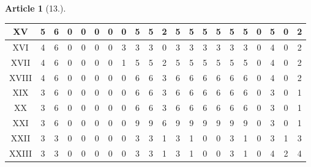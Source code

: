 \documentclass[11pt,a4paper]{article}
\theoremstyle{definition}
\newtheorem{art}{Article}
\begin{document}
\begin{art}[13.]
\begin{center}
\begin{tabular}{|c|c|c|c|c|c|c|c|c|c|c|c|c|c|c|c|c|c|c|c|c|}
\hline
XV & 5 & 6 & 0 & 0 & 0 & 0 & 0 & 5 & 5 & 2 & 5 & 5 & 5 & 5 & 5 & 5 & 0 & 5 & 0 & 2 \\
\hline
XVI & 4 & 6 & 0 & 0 & 0 & 0 & 3 & 3 & 3 & 0 & 3 & 3 & 3 & 3 & 3 & 3 & 0 & 4 & 0 & 2 \\
\hline
XVII & 4 & 6 & 0 & 0 & 0 & 0 & 1 & 5 & 5 & 2 & 5 & 5 & 5 & 5 & 5 & 5 & 0 & 4 & 0 & 2 \\
\hline
XVIII & 4 & 6 & 0 & 0 & 0 & 0 & 0 & 6 & 6 & 3 & 6 & 6 & 6 & 6 & 6 & 6 & 0 & 4 & 0 & 2 \\
\hline
XIX & 3 & 6 & 0 & 0 & 0 & 0 & 0 & 6 & 6 & 3 & 6 & 6 & 6 & 6 & 6 & 6 & 0 & 3 & 0 & 1 \\
\hline
XX & 3 & 6 & 0 & 0 & 0 & 0 & 0 & 6 & 6 & 3 & 6 & 6 & 6 & 6 & 6 & 6 & 0 & 3 & 0 & 1 \\
\hline
XXI & 3 & 6 & 0 & 0 & 0 & 0 & 0 & 9 & 9 & 6 & 9 & 9 & 9 & 9 & 9 & 9 & 0 & 3 & 0 & 1 \\
\hline
XXII & 3 & 3 & 0 & 0 & 0 & 0 & 0 & 3 & 3 & 1 & 3 & 1 & 0 & 0 & 3 & 1 & 0 & 3 & 1 & 3 \\
\hline
XXIII & 3 & 3 & 0 & 0 & 0 & 0 & 0 & 3 & 3 & 1 & 3 & 1 & 0 & 0 & 3 & 1 & 0 & 4 & 2 & 4 \\
\hline
\end{tabular}
\end{center}


\end{art}
\end{document}
